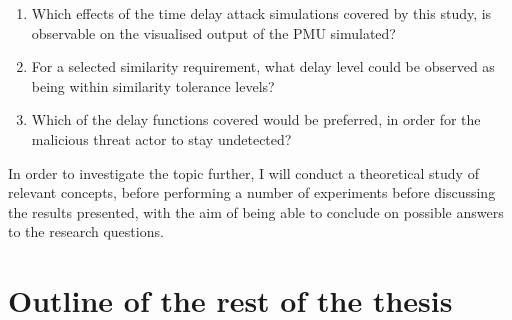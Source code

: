 \begin{enumerate}
    \item Which effects of the time delay attack simulations covered by this study, is observable on the visualised output of the PMU simulated?
    \item For a selected similarity requirement, what delay level could be observed as being within similarity tolerance levels?
    \item Which of the delay functions covered would be preferred, in order for the malicious threat actor to stay undetected?    

\end{enumerate}

In order to investigate the topic further, I will conduct a theoretical study of relevant concepts, before performing a number of experiments before discussing the results presented, with the aim of being able to conclude on possible answers to the research questions. 



\section{Outline of the rest of the thesis}



